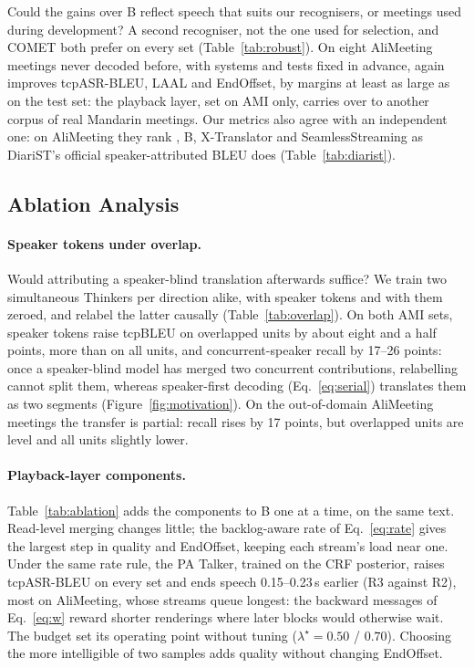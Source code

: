 Could the gains over B reflect speech that suits our recognisers, or meetings used during development? A second
recogniser, not the one used for selection, and COMET both prefer \sys{} on every set
(Table~\ref{tab:robust}). On eight AliMeeting meetings never decoded before, with systems and tests fixed in advance,
\sys{} again improves tcpASR-BLEU, LAAL and EndOffset, by margins at least as large as on the test set: the
playback layer, set on AMI only, carries over to another corpus of real Mandarin meetings. Our metrics
also agree with an independent one: on AliMeeting they rank \sys{}, B, X-Translator and SeamlessStreaming as DiariST's
official speaker-attributed BLEU does (Table~\ref{tab:diarist}).




\subsection{Ablation Analysis}
\label{sec:res-ablation}
\label{sec:res-overlap}

\paragraph{Speaker tokens under overlap.} Would attributing a speaker-blind translation afterwards suffice? We train two simultaneous Thinkers per direction alike, with speaker tokens and with them zeroed,
and relabel the latter causally (Table~\ref{tab:overlap}). On both AMI sets, speaker tokens raise tcpBLEU on overlapped
units by about eight and a half points, more than on all units, and concurrent-speaker recall by 17--26 points: once a
speaker-blind model has merged two concurrent contributions, relabelling cannot split them, whereas speaker-first
decoding (Eq.~\eqref{eq:serial}) translates them as two segments (Figure~\ref{fig:motivation}). On the out-of-domain
AliMeeting meetings the transfer is partial: recall rises by 17 points, but overlapped units are level and all units
slightly lower.

\paragraph{Playback-layer components.} Table~\ref{tab:ablation} adds the components to B one at a time, on the same
text. Read-level merging changes little; the backlog-aware rate of Eq.~\eqref{eq:rate} gives the largest step in quality
and EndOffset, keeping each stream's load near one. Under the same rate rule, the PA Talker, trained on the CRF posterior, raises
tcpASR-BLEU on every set and ends speech 0.15--0.23\,s earlier (R3 against R2), most on AliMeeting, whose streams queue
longest: the backward messages of Eq.~\eqref{eq:w} reward shorter renderings where later blocks would otherwise wait. The budget set its operating point without tuning ($\lambda^\star=0.50$ / $0.70$). Choosing the more intelligible of two samples adds quality without changing EndOffset.
